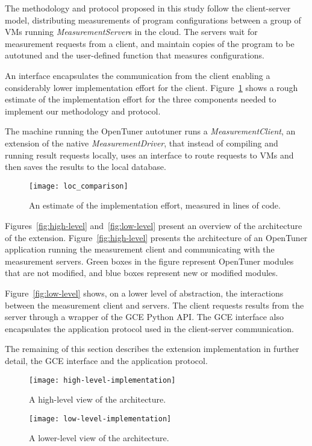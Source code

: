 The methodology and protocol proposed in this study follow the client-server
model, distributing measurements of program configurations between a group of
VMs running \emph{MeasurementServer}s in the cloud. The servers wait for
measurement requests from a client, and maintain copies of the program to be
autotuned and the user-defined function that measures configurations.

An interface encapsulates the communication from the client enabling a
considerably lower implementation effort for the client.
Figure~\ref{fig:loc-comp} shows a rough estimate of the implementation effort
for the three components needed to implement our methodology and protocol.

The machine running the OpenTuner autotuner runs a \emph{MeasurementClient}, an
extension of the native \emph{MeasurementDriver}, that instead of compiling and
running result requests locally, uses an interface to route requests to VMs and
then saves the results to the local database.

\begin{figure}[htpb]
    \centering
    \texttt{[image: loc\_comparison]}
    \caption{An estimate of the implementation effort, measured in lines of
    code.}
    \label{fig:loc-comp}
\end{figure}

Figures~\ref{fig:high-level} and~\ref{fig:low-level} present an overview of the
architecture of the extension.  Figure~\ref{fig:high-level} presents the
architecture of an OpenTuner application running the measurement client and
communicating with the measurement servers.  Green boxes in the figure
represent OpenTuner modules that are not modified, and blue boxes represent new
or modified modules.

Figure~\ref{fig:low-level} shows, on a lower level of abstraction, the
interactions between the measurement client and servers. The client requests
results from the server through a wrapper of the GCE Python API.  The GCE
interface also encapsulates the application protocol used in the client-server
communication.

The remaining of this section describes the extension implementation in further
detail, the GCE interface and the application protocol.

\begin{figure}[htpb]
    \centering
    \begin{minipage}{.45\textwidth}
        \centering
        \texttt{[image: high-level-implementation]}
        \caption{A high-level view of the architecture.}
        \label{fig:high-level}
    \end{minipage}%
    \hfill
    \begin{minipage}{.45\textwidth}
        \centering
        \texttt{[image: low-level-implementation]}
        \caption{A lower-level view of the architecture.}
        \label{fig:low-level}
    \end{minipage}%
    \label{fig:archs}
\end{figure}

